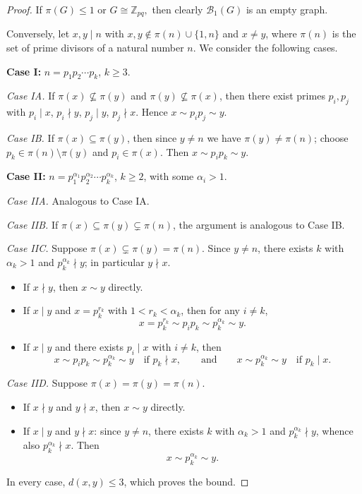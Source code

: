 \documentclass[12pt]{amsart}
\theoremstyle{plain}
\theoremstyle{remark}
\theoremstyle{definition}
\begin{document}
\begin{proof}
If $\pi(G) \leq 1$ or $G \cong \mathbb{Z}_{pq},$ then clearly $\mathcal{B}_1(G)$ is an empty graph.

Conversely,
let $x, y \mid n$ with $x, y \notin \pi(n) \cup \{1, n\}$ and $x \neq y$, where $\pi(n)$ is the set of prime divisors of a natural number $n$. We consider the following cases.

\medskip
\noindent\textbf{Case I:} $n = p_1 p_2 \cdots p_k$, $k \geq 3.$ 

\smallskip
\noindent\textit{Case IA.} If $\pi(x) \not\subseteq \pi(y)$ and $\pi(y) \not\subseteq \pi(x)$, then there exist primes $p_i, p_j$ with $p_i \mid x$, $p_i \nmid y$, $p_j \mid y$, $p_j \nmid x$. Hence
$x \sim p_ip_j \sim y.$

\smallskip
\noindent\textit{Case IB.} If $\pi(x) \subseteq \pi(y)$, then since $y \neq n$ we have $\pi(y) \neq \pi(n)$; choose $p_k \in \pi(n) \setminus \pi(y)$ and $p_i \in \pi(x)$. Then $x \sim p_ip_k \sim y.$

\medskip
\noindent\textbf{Case II:} $n = p_1^{\alpha_1}p_2^{\alpha_2}\cdots p_k^{\alpha_k}$, $k \geq 2$, with some $\alpha_i > 1$.

\smallskip
\noindent\textit{Case IIA.} Analogous to Case IA.

\smallskip
\noindent\textit{Case IIB.} If $\pi(x) \subseteq \pi(y) \subsetneq \pi(n)$, the argument is analogous to Case IB.

\smallskip
\noindent\textit{Case IIC.} Suppose $\pi(x) \subsetneq \pi(y) = \pi(n)$. Since $y \neq n$, there exists $k$ with $\alpha_k > 1$ and $p_k^{\alpha_k} \nmid y$; in particular $y \nmid x$.
\begin{itemize}
\item If $x \nmid y$, then $x \sim y$ directly.
\item If $x \mid y$ and $x = p_k^{r_k}$ with $1 < r_k < \alpha_k$, then for any $i \neq k$,
\[
x = p_k^{r_k} \sim p_ip_k \sim p_k^{\alpha_k} \sim y.
\]
\item If $x \mid y$ and there exists $p_i \mid x$ with $i \neq k$, then
\[
x \sim p_ip_k \sim p_k^{\alpha_k} \sim y \quad \text{if } p_k \nmid x, \qquad\text{and}\qquad x \sim p_k^{\alpha_k} \sim y \quad \text{if } p_k \mid x.
\]
\end{itemize}

\smallskip
\noindent\textit{Case IID.} Suppose $\pi(x) = \pi(y) = \pi(n)$.
\begin{itemize}
\item If $x \nmid y$ and $y \nmid x$, then $x \sim y$ directly.
\item If $x \mid y$ and $y \nmid x$: since $y \neq n$, there exists $k$ with $\alpha_k > 1$ and $p_k^{\alpha_k} \nmid y$, whence also $p_k^{\alpha_k} \nmid x$. Then
\[
x \sim p_k^{\alpha_k} \sim y.
\]
\end{itemize}

In every case, $d(x,y) \leq 3$, which proves the bound.
\end{proof}
\end{document}

